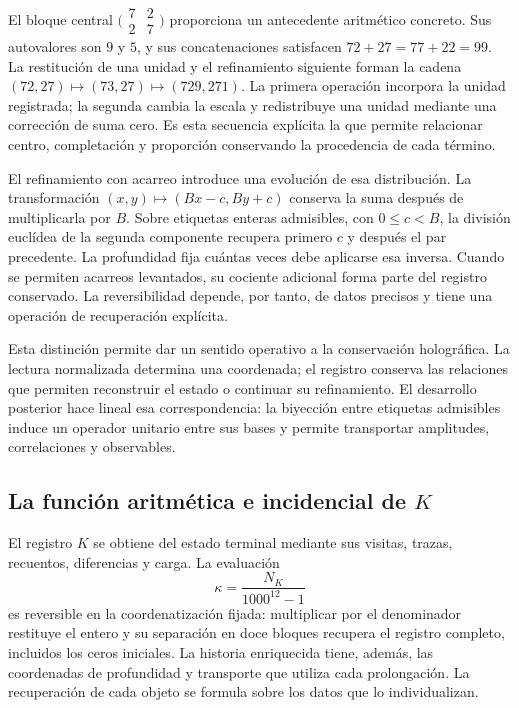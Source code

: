 El bloque central \(\bigl(\begin{smallmatrix}7&2\\2&7\end{smallmatrix}\bigr)\) proporciona un antecedente aritmético concreto. Sus autovalores son \(9\) y \(5\), y sus concatenaciones satisfacen \(72+27=77+22=99\). La restitución de una unidad y el refinamiento siguiente forman la cadena \((72,27)\mapsto(73,27)\mapsto(729,271)\). La primera operación incorpora la unidad registrada; la segunda cambia la escala y redistribuye una unidad mediante una corrección de suma cero. Es esta secuencia explícita la que permite relacionar centro, completación y proporción conservando la procedencia de cada término.

El refinamiento con acarreo introduce una evolución de esa distribución. La transformación \((x,y)\mapsto(Bx-c,By+c)\) conserva la suma después de multiplicarla por \(B\). Sobre etiquetas enteras admisibles, con \(0\leq c<B\), la división euclídea de la segunda componente recupera primero \(c\) y después el par precedente. La profundidad fija cuántas veces debe aplicarse esa inversa. Cuando se permiten acarreos levantados, su cociente adicional forma parte del registro conservado. La reversibilidad depende, por tanto, de datos precisos y tiene una operación de recuperación explícita.

Esta distinción permite dar un sentido operativo a la conservación holográfica. La lectura normalizada determina una coordenada; el registro conserva las relaciones que permiten reconstruir el estado o continuar su refinamiento. El desarrollo posterior hace lineal esa correspondencia: la biyección entre etiquetas admisibles induce un operador unitario entre sus bases y permite transportar amplitudes, correlaciones y observables.

\subsection*{La función aritmética e incidencial de \(K\)}
El registro \(K\) se obtiene del estado terminal mediante sus visitas, trazas, recuentos, diferencias y carga. La evaluación
\[
\kappa=\frac{N_K}{1000^{12}-1}
\]
es reversible en la coordenatización fijada: multiplicar por el denominador restituye el entero y su separación en doce bloques recupera el registro completo, incluidos los ceros iniciales. La historia enriquecida tiene, además, las coordenadas de profundidad y transporte que utiliza cada prolongación. La recuperación de cada objeto se formula sobre los datos que lo individualizan.

